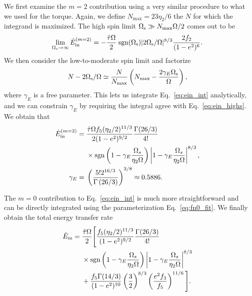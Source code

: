 \documentclass[
        fleqn,
        usenatbib,
    ]{mnras}
\newcommand*{\p}[1]{\left(#1\right)}
\begin{document}
We first examine the $m = 2$ contribution using a very similar procedure to what
we used for the torque. Again, we define $N_{\max} = 23\eta_2 / 6$ the $N$ for
which the integrand is maximized. The high spin limit $\Omega_{\rm s} \gg
N_{\max}\Omega / 2$ comes out to be
\begin{equation}
    \lim_{\Omega_{\rm s} \to \infty} \dot{E}_{\rm in}^{(m=2)} =
        -\frac{\hat{\tau}\Omega}{2} \; \mathrm{sgn}(\Omega_{\rm s})|2\Omega_{\rm
        s}/\Omega|^{8/3} \frac{2f_2}{(1 - e^2)^6}.\label{eq:ein_highs}
\end{equation}
We then consider the low-to-moderate spin limit and factorize
\begin{equation}
    N - 2\Omega_{\rm s} / \Omega \simeq \frac{N}{N_{\max}}
        \left(N_{\max} - \frac{2\gamma_E
        \Omega_{\rm s}}{\Omega}\right)\label{eq:nmax_ansatz},
\end{equation}
where $\gamma_E$ is a free parameter. This lets us integrate
Eq.~\eqref{eq:ein_int} analytically, and we can constrain $\gamma_E$ by
requiring the integral agree with Eq.~\eqref{eq:ein_highs}. We obtain that
\begin{align}
    \dot{E}_{\rm in}^{(m=2)}
        ={}& \frac{\hat{\tau}\Omega f_5 (\eta_2/2)^{11/3}}{2(1-e^2)^{9/2}}
            \frac{\Gamma(26/3)}{4!}\nonumber\\
        &\times \mathrm{sgn}\p{1 - \gamma_E\frac{\Omega_s}{\eta_2 \Omega}}
            \left|1 - \gamma_E\frac{\Omega_s}{\eta_2 \Omega}\right|^{8/3},\\
    \gamma_E ={}& \p{\frac{5! 2^{16/3}}{\Gamma\p{26/3}}}^{3/8}
        \approx 0.5886.
\end{align}

The $m = 0$ contribution to Eq.~\eqref{eq:ein_int} is much more straightforward
and can be directly integrated using the parameterization
Eq.~\eqref{eq:fn0_fit}. We finally obtain the total energy transfer rate
\begin{align}
    \dot{E}_{\rm in} ={}& \frac{\hat{\tau} \Omega}{2}\Bigg[\frac{f_5
        (\eta_2/2)^{11/3}}{(1-e^2)^{9/2}} \frac{\Gamma(26/3)}{4!}\nonumber\\
        &\times \mathrm{sgn}\p{1 - \gamma_E\frac{\Omega_s}{\eta_2 \Omega}}
            \left|1 - \gamma_E\frac{\Omega_s}{\eta_2 \Omega}\right|^{8/3}
            \nonumber\\
        &+
    \frac{f_5 \Gamma(14 / 3)}{(1 - e^2)^{10}} \left(\frac{3}{2}\right)^{8/3}
            \left(\frac{e^2 f_3}{f_5}\right)^{11/6}\Bigg].
            \label{eq:ein_dot_tot}
\end{align}
\end{document}
